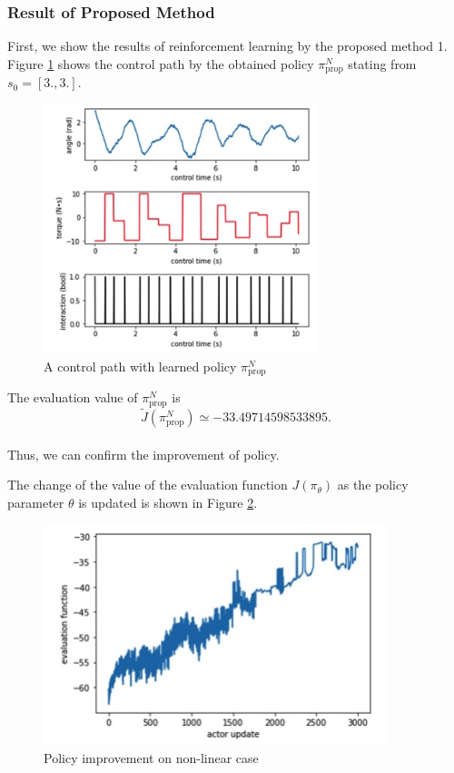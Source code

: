 \documentclass[english, dvipdfmx]{ampmt}             %
\begin{document}
\subsubsection{Result of Proposed Method}
First, we show the results of reinforcement learning by the proposed method 1. Figure \ref{proposed_1_nl} shows the control path by the obtained policy $\pi_{\textrm{prop}}^N$ stating from $s_0 = [3., 3.]$.
\begin{figure}[H]
	\centering
 	\includegraphics[width=8cm]{proposed_1_nl.png}
 	\caption{A control path with learned policy $\pi_{\textrm{prop}}^N$} \label{proposed_1_nl}
\end{figure}
The evaluation value of $\pi_{\textrm{prop}}^N$ is
\begin{equation}
	\tilde{J}(\pi_{\textrm{prop}}^N) \simeq -33.49714598533895.
\end{equation}\\
Thus, we can confirm the improvement of policy.\par
The change of the value of the evaluation function $J( \pi_{\theta})$ as the policy parameter $\theta$ is updated is shown in Figure \ref{evaluation_log_nl}.
\begin{figure}[H]
	\centering
 	\includegraphics[width=10cm]{evaluation_log_nl.png}
 	\caption{Policy improvement on non-linear case} \label{evaluation_log_nl}
\end{figure}
\end{document}
